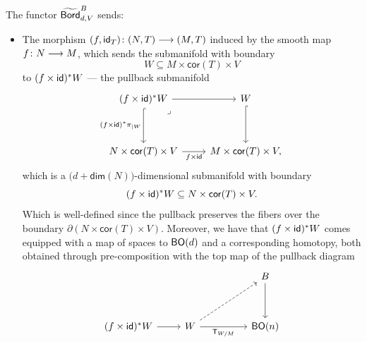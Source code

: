 \begin{definition}
    \noindent The functor $\widetilde{\operatorname{\mathsf{Bord}}}^{B}_{d,V}$ sends:
    \begin{itemize}
    \item[($\man$):] The morphism $(f,\mathsf{id}_{T})\colon (N,T) \longrightarrow (M,T)$ induced by the smooth map $f\colon N \longrightarrow M$, which sends the submanifold with boundary
    \begin{equation}
         W\subseteq M\times \mathsf{cor}(T) \times V 
    \end{equation}
    to $(f \times \operatorname{\sf id})^{*} W$ — the pullback submanifold 
    \begin{equation}
        \begin{tikzcd}[ampersand replacement=\&]
            {(f\times \id)^\ast W} \& {W} \\
            \\
            N\times \mathsf{cor}(T) \times V \& M\times \mathsf{cor}(T) \times V,
            \arrow[from=1-1, to=1-2]
            \arrow[hook, "(f\times \id)^\ast \pi_{|W}"',from=1-1, to=3-1]
            \arrow["\lrcorner"{anchor=center, pos=0.125}, draw=none, from=1-1, to=3-2]
            \arrow[hook, from=1-2, to=3-2]
            \arrow["f\times \id"', from=3-1, to=3-2]
        \end{tikzcd}
    \end{equation}
    which is a $\big(d + \mathsf{dim}(N)\big)$-dimensional submanifold with boundary
    \begin{equation}
        (f\times \operatorname{\sf id})^* W \subseteq N \times \mathsf{cor}(T) \times V.
    \end{equation}
Which is well-defined since the pullback preserves the fibers over the boundary $\partial (N \times \mathsf{cor}(T) \times V)$. Moreover, we have that $(f\times \operatorname{\sf id})^* W$ comes equipped with a map of spaces to $\mathsf B\mathsf O(d)$ and a corresponding homotopy, both obtained through pre-composition with the top map of the pullback diagram
    \begin{equation}
        \begin{tikzcd}
            &&& B \\
            \\
            {(f\times \id)^*W} & W && {\sB\sO(n)}
            \arrow[from=1-4, to=3-4]
            \arrow[from=3-1, to=3-2]
            \arrow[dashed, from=3-2, to=1-4]
            \arrow["{\sT_{W/M}}"', from=3-2, to=3-4]
        \end{tikzcd}
    \end{equation}


\end{itemize}
\end{definition}
